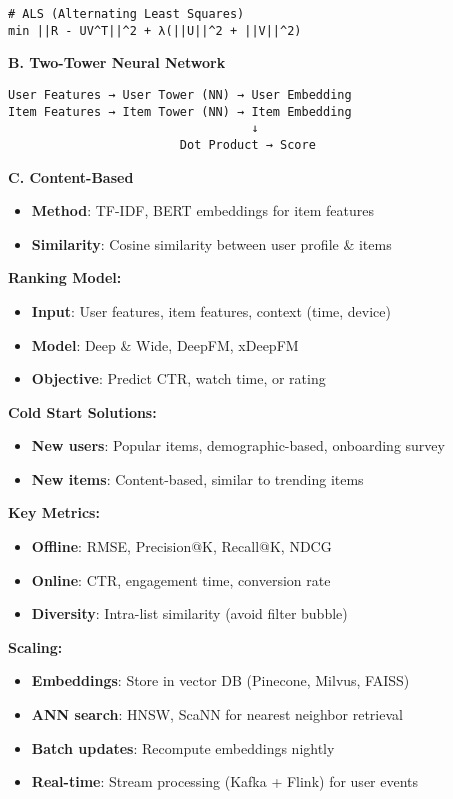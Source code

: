 \documentclass[8pt,landscape]{article}
\begin{document}
\begin{multicols}{3}
\begin{verbatim}
# ALS (Alternating Least Squares)
min ||R - UV^T||^2 + λ(||U||^2 + ||V||^2)
\end{verbatim}

\textbf{B. Two-Tower Neural Network}
\begin{verbatim}
User Features → User Tower (NN) → User Embedding
Item Features → Item Tower (NN) → Item Embedding
                                  ↓
                        Dot Product → Score
\end{verbatim}

\textbf{C. Content-Based}
\begin{itemize}
\item \textbf{Method}: TF-IDF, BERT embeddings for item features
\item \textbf{Similarity}: Cosine similarity between user profile \& items
\end{itemize}

\textbf{Ranking Model:}
\begin{itemize}
\item \textbf{Input}: User features, item features, context (time, device)
\item \textbf{Model}: Deep \& Wide, DeepFM, xDeepFM
\item \textbf{Objective}: Predict CTR, watch time, or rating
\end{itemize}

\textbf{Cold Start Solutions:}
\begin{itemize}
\item \textbf{New users}: Popular items, demographic-based, onboarding survey
\item \textbf{New items}: Content-based, similar to trending items
\end{itemize}

\textbf{Key Metrics:}
\begin{itemize}
\item \textbf{Offline}: RMSE, Precision@K, Recall@K, NDCG
\item \textbf{Online}: CTR, engagement time, conversion rate
\item \textbf{Diversity}: Intra-list similarity (avoid filter bubble)
\end{itemize}

\textbf{Scaling:}
\begin{itemize}
\item \textbf{Embeddings}: Store in vector DB (Pinecone, Milvus, FAISS)
\item \textbf{ANN search}: HNSW, ScaNN for nearest neighbor retrieval
\item \textbf{Batch updates}: Recompute embeddings nightly
\item \textbf{Real-time}: Stream processing (Kafka + Flink) for user events
\end{itemize}


\end{multicols}
\end{document}

